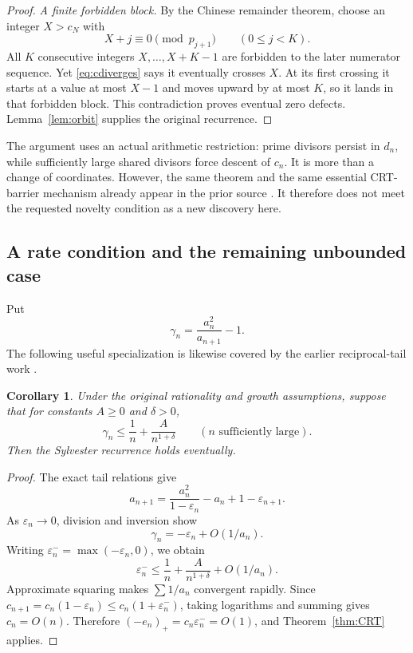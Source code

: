 \documentclass[11pt,a4paper]{article}
\newtheorem{corollary}[theorem]{Corollary}
\theoremstyle{definition}
\theoremstyle{remark}\newtheorem{remark}[theorem]{Remark}
\begin{document}
\begin{proof}
\emph{A finite forbidden block.}
By the Chinese remainder theorem, choose an integer $X>c_N$ with
\[
 X+j\equiv0\pmod{p_{j+1}}\qquad(0\le j<K).
\]
All $K$ consecutive integers $X,\ldots,X+K-1$ are forbidden to
the later numerator sequence. Yet \eqref{eq:cdiverges} says it
eventually crosses $X$. At its first crossing it starts at a value
at most $X-1$ and moves upward by at most $K$, so it lands in that
forbidden block. This contradiction proves eventual zero defects.
Lemma~\ref{lem:orbit} supplies the original recurrence.
\end{proof}

The argument uses an actual arithmetic restriction: prime divisors
persist in $d_n$, while sufficiently large shared divisors force
descent of $c_n$. It is more than a change of coordinates. However,
the same theorem and the same essential CRT-barrier mechanism
already appear in the prior source \cite{Cook}. It therefore does
not meet the requested novelty condition as a new discovery here.

\subsection{A rate condition and the remaining unbounded case}

Put
\[
 \gamma_n=\frac{a_n^2}{a_{n+1}}-1.
\]
The following useful specialization is likewise covered by the
earlier reciprocal-tail work \cite{Cook}.

\begin{corollary}\label{cor:rate}
Under the original rationality and growth assumptions, suppose
that for constants $A\ge0$ and $\delta>0$,
\begin{equation}\label{eq:rate}
 \gamma_n\le\frac1n+\frac{A}{n^{1+\delta}}
 \qquad(n\text{ sufficiently large}).
\end{equation}
Then the Sylvester recurrence holds eventually.
\end{corollary}
\begin{proof}
The exact tail relations give
\[
 a_{n+1}=\frac{a_n^2}{1-\varepsilon_n}-a_n+1-\varepsilon_{n+1}.
\]
As $\varepsilon_n\to0$, division and inversion show
\[
 \gamma_n=-\varepsilon_n+O(1/a_n).
\]
Writing $\varepsilon_n^- =\max(-\varepsilon_n,0)$, we obtain
\[
 \varepsilon_n^-\le\frac1n+\frac{A}{n^{1+\delta}}+O(1/a_n).
\]
Approximate squaring makes $\sum 1/a_n$ convergent rapidly. Since
$c_{n+1}=c_n(1-\varepsilon_n)\le c_n(1+\varepsilon_n^-)$,
taking logarithms and summing gives $c_n=O(n)$. Therefore
$(-e_n)_+=c_n\varepsilon_n^-=O(1)$, and
Theorem~\ref{thm:CRT} applies.
\end{proof}
\end{document}
